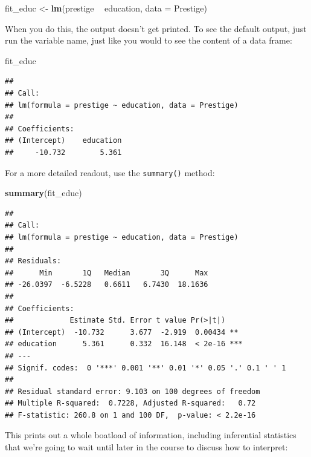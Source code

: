 \documentclass[12pt,oneside,openany]{book}
\newenvironment{Shaded}{\begin{snugshade}}{\end{snugshade}}
\newcommand{\KeywordTok}[1]{\textcolor[rgb]{0.13,0.29,0.53}{\textbf{#1}}}
\newcommand{\DataTypeTok}[1]{\textcolor[rgb]{0.13,0.29,0.53}{#1}}
\newcommand{\StringTok}[1]{\textcolor[rgb]{0.31,0.60,0.02}{#1}}
\newcommand{\OperatorTok}[1]{\textcolor[rgb]{0.81,0.36,0.00}{\textbf{#1}}}
\newcommand{\NormalTok}[1]{#1}
\begin{document}
\begin{Shaded}
\begin{Highlighting}[]
\NormalTok{fit_educ <-}\StringTok{ }\KeywordTok{lm}\NormalTok{(prestige }\OperatorTok{~}\StringTok{ }\NormalTok{education, }\DataTypeTok{data =}\NormalTok{ Prestige)}
\end{Highlighting}
\end{Shaded}

When you do this, the output doesn't get printed. To see the default
output, just run the variable name, just like you would to see the
content of a data frame:

\begin{Shaded}
\begin{Highlighting}[]
\NormalTok{fit_educ}
\end{Highlighting}
\end{Shaded}

\begin{verbatim}
## 
## Call:
## lm(formula = prestige ~ education, data = Prestige)
## 
## Coefficients:
## (Intercept)    education  
##     -10.732        5.361
\end{verbatim}

For a more detailed readout, use the \texttt{summary()} method:

\begin{Shaded}
\begin{Highlighting}[]
\KeywordTok{summary}\NormalTok{(fit_educ)}
\end{Highlighting}
\end{Shaded}

\begin{verbatim}
## 
## Call:
## lm(formula = prestige ~ education, data = Prestige)
## 
## Residuals:
##      Min       1Q   Median       3Q      Max 
## -26.0397  -6.5228   0.6611   6.7430  18.1636 
## 
## Coefficients:
##             Estimate Std. Error t value Pr(>|t|)    
## (Intercept)  -10.732      3.677  -2.919  0.00434 ** 
## education      5.361      0.332  16.148  < 2e-16 ***
## ---
## Signif. codes:  0 '***' 0.001 '**' 0.01 '*' 0.05 '.' 0.1 ' ' 1
## 
## Residual standard error: 9.103 on 100 degrees of freedom
## Multiple R-squared:  0.7228, Adjusted R-squared:   0.72 
## F-statistic: 260.8 on 1 and 100 DF,  p-value: < 2.2e-16
\end{verbatim}

This prints out a whole boatload of information, including inferential
statistics that we're going to wait until later in the course to discuss
how to interpret:
\end{document}
